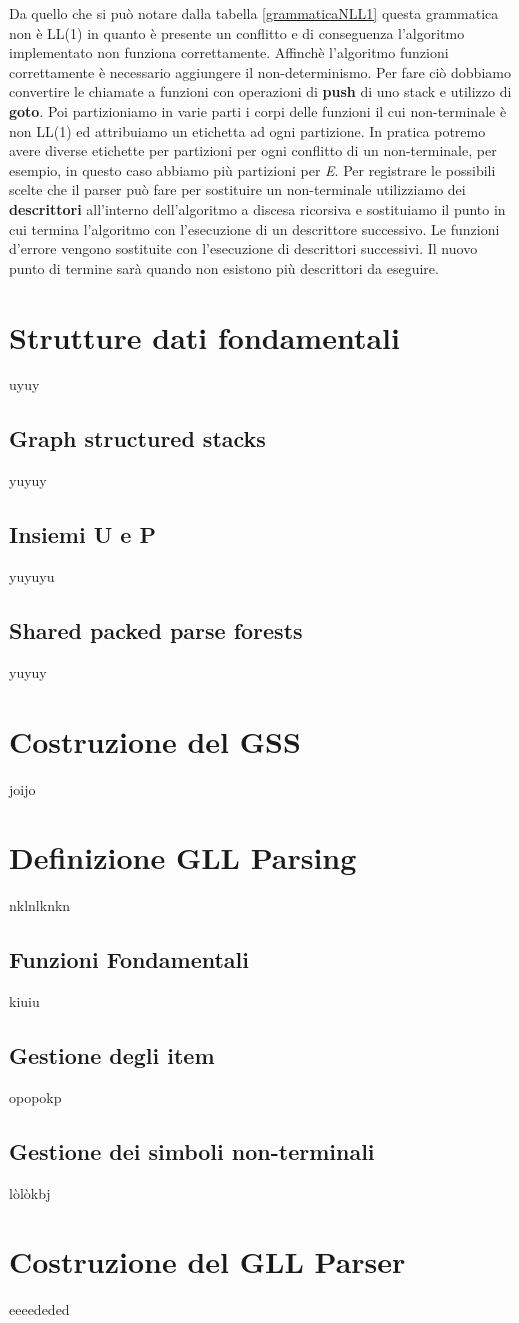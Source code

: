 Da quello che si può notare dalla tabella \ref{grammaticaNLL1} questa grammatica non è LL(1) in quanto è presente un conflitto e di conseguenza l'algoritmo implementato non funziona correttamente. Affinchè l'algoritmo funzioni correttamente è necessario aggiungere il non-determinismo. Per fare ciò dobbiamo convertire le chiamate a funzioni con operazioni di \textbf{push} di  uno stack e utilizzo di \textbf{goto}. Poi partizioniamo in varie parti i corpi delle funzioni il cui non-terminale è non LL(1) ed attribuiamo un etichetta ad ogni partizione. In pratica potremo avere diverse etichette per partizioni per ogni conflitto di un non-terminale, per esempio, in questo caso abbiamo più partizioni per \textit{E}. Per registrare le possibili scelte che il parser può fare per sostituire un non-terminale utilizziamo dei \textbf{descrittori} all'interno dell'algoritmo a discesa ricorsiva e sostituiamo il punto in cui termina l'algoritmo con l'esecuzione di un descrittore successivo. Le funzioni d'errore vengono sostituite con l'esecuzione di descrittori successivi. Il nuovo punto di termine sarà quando non esistono più descrittori da eseguire.
\section{Strutture dati fondamentali}
uyuy
\subsection{Graph structured stacks}
yuyuy
\subsection{Insiemi U e P}
yuyuyu
\subsection{Shared packed parse forests}
yuyuy
\section{Costruzione del GSS}
joijo
\section{Definizione GLL Parsing}
nklnlknkn
\subsection{Funzioni Fondamentali}
kiuiu
\subsection{Gestione degli item}
opopokp
\subsection{Gestione dei simboli non-terminali}
lòlòkbj
\section{Costruzione del GLL Parser}
eeeededed